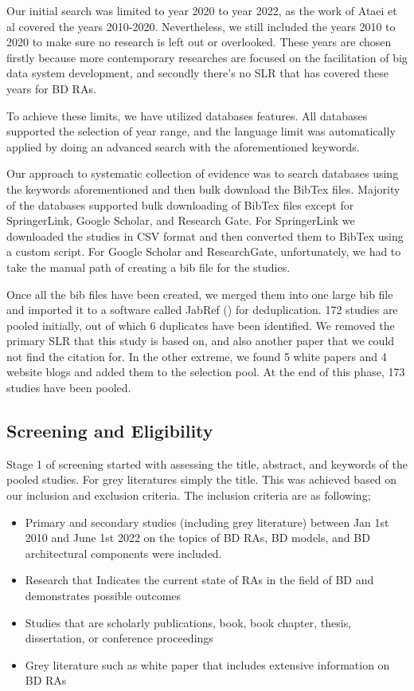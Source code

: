 \documentclass[review]{elsarticle}
\begin{document}
Our initial search was limited to year 2020 to year 2022, as the work of Ataei et al \cite{AtaeiACIS} covered the years 2010-2020. Nevertheless, we still included the years 2010 to 2020 to make sure no research is left out or overlooked. These years are chosen firstly because more contemporary researches are focused on the facilitation of big data system development, and secondly there's no SLR that has covered these years for BD RAs.

To achieve these limits, we have utilized databases features. All databases supported the selection of year range, and the language limit was automatically applied by doing an advanced search with the aforementioned keywords.

Our approach to systematic collection of evidence was to search databases using the keywords aforementioned and then bulk download the BibTex files. Majority of the databases supported bulk downloading of BibTex files except for SpringerLink, Google Scholar, and Research Gate. For SpringerLink we downloaded the studies in CSV format and then converted them to BibTex using a custom script. For Google Scholar and ResearchGate, unfortunately, we had to take the manual path of creating a bib file for the studies. 

Once all the bib files have been created, we merged them into one large bib file and imported it to a software called JabRef (\cite{JabRef}) for deduplication. 172 studies are pooled initially, out of which 6 duplicates have been identified. We removed the primary SLR that this study is based on, and also another paper that we could not find the citation for. In the other extreme, we found 5 white papers and 4 website blogs and added them to the selection pool. At the end of this phase, 173 studies have been pooled. 

\subsection{Screening and Eligibility}

Stage 1 of screening started with assessing the title, abstract, and keywords of the pooled studies. For grey literatures simply the title. This was achieved based on our inclusion and exclusion criteria. The inclusion criteria are as following;

\begin{itemize}
    \item Primary and secondary studies (including grey literature) between Jan 1st 2010 and June 1st 2022 on the topics of BD RAs, BD models, and BD architectural components were included. 
    \item Research that Indicates the current state of RAs in the field of BD and demonstrates possible outcomes
    \item Studies that are scholarly publications, book, book chapter, thesis, dissertation, or conference proceedings 
    \item Grey literature such as white paper that includes extensive information on BD RAs
\end{itemize}
\end{document}
